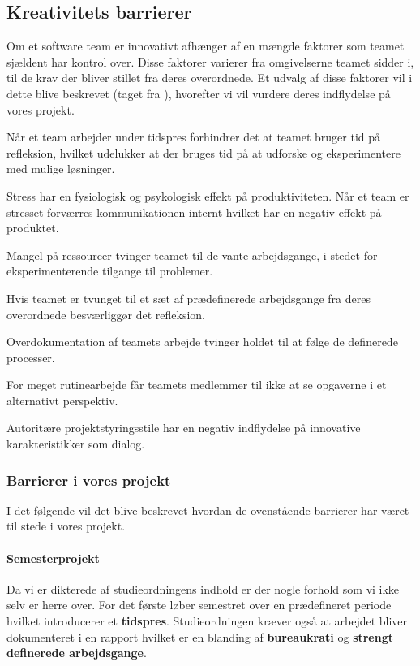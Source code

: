 \subsection{Kreativitets barrierer}
Om et software team er innovativt afhænger af en mængde faktorer som teamet sjældent har kontrol over.
Disse faktorer varierer fra omgivelserne teamet sidder i, til de krav der bliver stillet fra deres overordnede.
Et udvalg af disse faktorer vil i dette blive beskrevet (taget fra \citet[s.~81-82]{book:softwareinnovation}), hvorefter vi vil vurdere deres indflydelse på vores projekt.

\begin{description}[style=nextline]
	\item[Tidspres] Når et team arbejder under tidspres forhindrer det at teamet bruger tid på refleksion, hvilket udelukker at der bruges tid på at udforske og eksperimentere med mulige løsninger.
	\item[Stress] Stress har en fysiologisk og psykologisk effekt på produktiviteten. Når et team er stresset forværres kommunikationen internt hvilket har en negativ effekt på produktet.
	\item[Ressource mangel] Mangel på ressourcer tvinger teamet til de vante arbejdsgange, i stedet for eksperimenterende tilgange til problemer.
	\item[Strengt definerede arbejdsgange] Hvis teamet er tvunget til et sæt af prædefinerede arbejdsgange fra deres overordnede besværliggør det refleksion.
	\item[Bureaukrati] Overdokumentation af teamets arbejde tvinger holdet til at følge de definerede processer.
	\item[Rutinearbejde] For meget rutinearbejde får teamets medlemmer til ikke at se opgaverne i et alternativt perspektiv.
	\item[Dårlig projektstyring] Autoritære projektstyringsstile har en negativ indflydelse på innovative karakteristikker som dialog.
\end{description}

\subsubsection{Barrierer i vores projekt}
I det følgende vil det blive beskrevet hvordan de ovenstående barrierer har været til stede i vores projekt.

\paragraph{Semesterprojekt}
Da vi er dikterede af studieordningens indhold er der nogle forhold som vi ikke selv er herre over.
For det første løber semestret over en prædefineret periode hvilket introducerer et \textbf{tidspres}.
Studieordningen kræver også at arbejdet bliver dokumenteret i en rapport hvilket er en blanding af \textbf{bureaukrati} og \textbf{strengt definerede arbejdsgange}.

